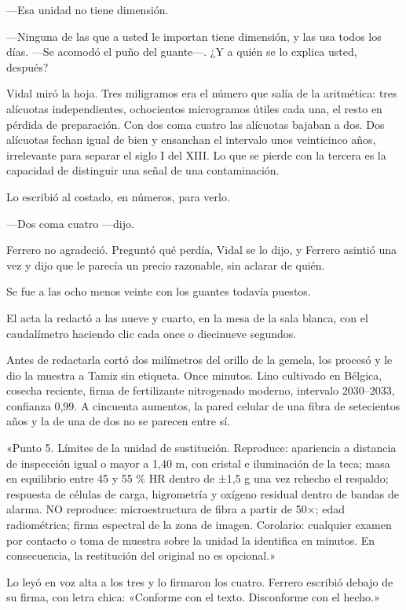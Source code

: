 ---Esa unidad no tiene dimensión.

---Ninguna de las que a usted le importan tiene dimensión, y las usa todos los días. ---Se acomodó el puño del guante---. ¿Y a quién se lo explica usted, después?

Vidal miró la hoja. Tres miligramos era el número que salía de la aritmética: tres alícuotas independientes, ochocientos microgramos útiles cada una, el resto en pérdida de preparación. Con dos coma cuatro las alícuotas bajaban a dos. Dos alícuotas fechan igual de bien y ensanchan el intervalo unos veinticinco años, irrelevante para separar el siglo I del XIII. Lo que se pierde con la tercera es la capacidad de distinguir una señal de una contaminación.

Lo escribió al costado, en números, para verlo.

---Dos coma cuatro ---dijo.

Ferrero no agradeció. Preguntó qué perdía, Vidal se lo dijo, y Ferrero asintió una vez y dijo que le parecía un precio razonable, sin aclarar de quién.

Se fue a las ocho menos veinte con los guantes todavía puestos.


\scenebreak


El acta la redactó a las nueve y cuarto, en la mesa de la sala blanca, con el caudalímetro haciendo clic cada once o diecinueve segundos.

Antes de redactarla cortó dos milímetros del orillo de la gemela, los procesó y le dio la muestra a Tamiz sin etiqueta. Once minutos. Lino cultivado en Bélgica, cosecha reciente, firma de fertilizante nitrogenado moderno, intervalo 2030--2033, confianza 0,99. A cincuenta aumentos, la pared celular de una fibra de setecientos años y la de una de dos no se parecen entre sí.

«Punto 5. Límites de la unidad de sustitución. Reproduce: apariencia a distancia de inspección igual o mayor a 1,40 m, con cristal e iluminación de la teca; masa en equilibrio entre 45 y 55 \% HR dentro de ±1,5 g una vez rehecho el respaldo; respuesta de células de carga, higrometría y oxígeno residual dentro de bandas de alarma. NO reproduce: microestructura de fibra a partir de 50×; edad radiométrica; firma espectral de la zona de imagen. Corolario: cualquier examen por contacto o toma de muestra sobre la unidad la identifica en minutos. En consecuencia, la restitución del original no es opcional.»

Lo leyó en voz alta a los tres y lo firmaron los cuatro. Ferrero escribió debajo de su firma, con letra chica: «Conforme con el texto. Disconforme con el hecho.»

